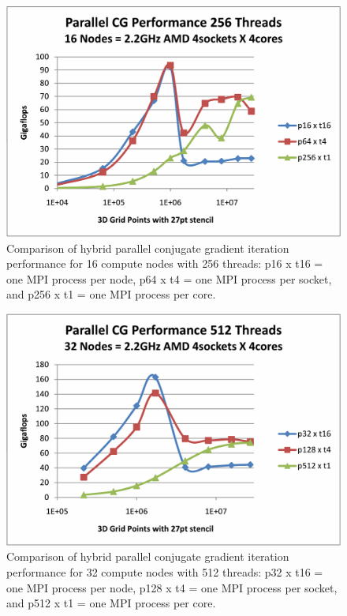 \begin{figure}[h]
\center
\includegraphics[viewport=1in 0.5in 8.5in 6.5in,angle=0,scale=0.5]{figures/test-hhpccg-intel-11-1-mpi-exe-np16-no-overlap-2}
\caption{Comparison of hybrid parallel conjugate gradient iteration performance for 16 compute nodes with 256 threads: p16 x t16 = one MPI process per node, p64 x t4 = one MPI process per socket, and p256 x t1 = one MPI process per core.}
\label{fig:CGPerf:np16}
\end{figure}

\begin{figure}[h]
\center
\includegraphics[viewport=1in 0.5in 8.5in 6.5in,angle=0,scale=0.5]{figures/test-hhpccg-intel-11-1-mpi-exe-np32-no-overlap}
\caption{Comparison of hybrid parallel conjugate gradient iteration performance for 32 compute nodes with 512 threads: p32 x t16 = one MPI process per node, p128 x t4 = one MPI process per socket, and p512 x t1 = one MPI process per core.}
\label{fig:CGPerf:np32}
\end{figure}


